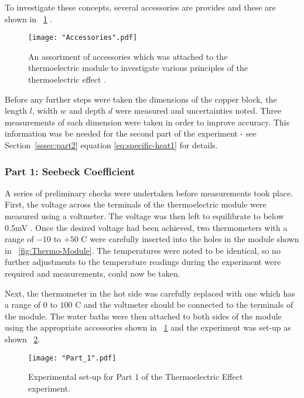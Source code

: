 \documentclass{article}
\newcommand{\figref}[2][\figurename~]{#1\ref{#2}}
\newcommand{\secref}[2][Section~]{#1\ref{#2}}
\begin{document}
\vspace{2mm}  
\noindent
To investigate these concepts, several accessories are provides and these are shown in \figref{fig:accessories} \cite{Paper02}.

\begin{figure}[h]
\centering
\texttt{[image: "Accessories".pdf]}
\caption{An assortment of accessories which was attached to the thermoelectric module to investigate various principles of the thermoelectric effect \cite{Paper02}.}
\label{fig:accessories}
\end{figure}

\newpage
\vspace{2mm}  
\noindent    
Before any further steps were taken the dimensions of the copper block, the length $l$, width $w$ and depth $d$ were measured and uncertainties noted. Three measurements of each dimension were taken in order to improve accuracy. This information was be needed for the second part of the experiment - see \secref{sssec:part2} equation \eqref{eq:specific-heat1} for details.

\subsubsection{Part 1: Seebeck Coefficient}
\label{sssec:part1}

A series of preliminary checks were undertaken before measurements took place. First, the voltage across the terminals of the thermoelectric module were measured using a voltmeter. The voltage was then left to equilibrate to below 0.5mV \cite{Paper02}. Once the desired voltage had been achieved, two thermometers with a range of $-10$ to $+50$ C were carefully inserted into the holes in the module shown in \figref{fig:Thermo-Module}. The temperatures were noted to be identical, so no further adjustments to the temperature readings during the experiment were required and measurements, could now be taken.

\vspace{2mm}  
\noindent
Next, the thermometer in the hot side was carefully replaced with one which has a range of $0$ to $100$ C and the voltmeter should be connected to the terminals of the module. The water baths were then attached to both sides of the module using the appropriate accessories shown in \figref{fig:accessories} and the experiment was set-up as shown \figref{fig:part1}.

\begin{figure}[h]
\centering
\texttt{[image: "Part\_1".pdf]}
\caption{Experimental set-up for Part 1 of the Thermoelectric Effect experiment.}
\label{fig:part1}
\end{figure}
\end{document}
